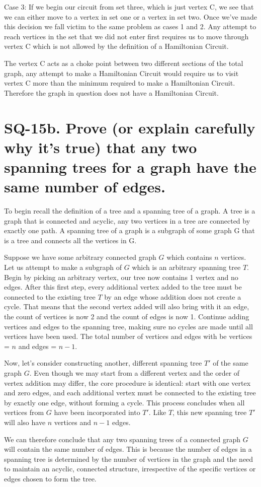 \documentclass{article}
\begin{document}
Case 3: If we begin our circuit from set three, which is just vertex C, we see that we can either move to a vertex in set one or a vertex in set two. Once we've made this decision we fall victim to the same problem as cases 1 and 2. Any attempt to reach vertices in the set that we did not enter first requires us to move through vertex C which is not allowed by the definition of a Hamiltonian Circuit.

The vertex C acts as a choke point between two different sections of the total graph, any attempt to make a Hamiltonian Circuit would require us to visit vertex C more than the minimum required to make a Hamiltonian Circuit. Therefore the graph in question does not have a Hamiltonian Circuit.

\newpage

\section*{SQ-15b. Prove (or explain carefully why it's true) that any two spanning trees for a graph have the same number of edges.}

\hspace*{\parindent}To begin recall the definition of a tree and a spanning tree of a graph. A tree is a graph that is connected and acyclic, any two vertices in a tree are connected by exactly one path. A spanning tree of a graph is a subgraph of some graph G that is a tree and connects all the vertices in G.

Suppose we have some arbitrary connected graph $G$ which contains $n$ vertices. Let us attempt to make a subgraph of $G$ which is an arbitrary spanning tree $T$. Begin by picking an arbitrary vertex, our tree now contains 1 vertex and no edges. After this first step, every additional vertex added to the tree must be connected to the existing tree $T$ by an edge whose addition does not create a cycle. That means that the second vertex added will also bring with it an edge, the count of vertices is now 2 and the count of edges is now 1. Continue adding vertices and edges to the spanning tree, making sure no cycles are made until all vertices have been used. The total number of vertices and edges with be vertices = $n$ and edges = $n-1$.

Now, let's consider constructing another, different spanning tree $T'$ of the same graph $G$. Even though we may start from a different vertex and the order of vertex addition may differ, the core procedure is identical: start with one vertex and zero edges, and each additional vertex must be connected to the existing tree by exactly one edge, without forming a cycle. This process concludes when all vertices from $G$ have been incorporated into $T'$. Like $T$, this new spanning tree $T'$ will also have $n$ vertices and $n-1$ edges.

We can therefore conclude that any two spanning trees of a connected graph $G$ will contain the same number of edges. This is because the number of edges in a spanning tree is determined by the number of vertices in the graph and the need to maintain an acyclic, connected structure, irrespective of the specific vertices or edges chosen to form the tree.
\end{document}
